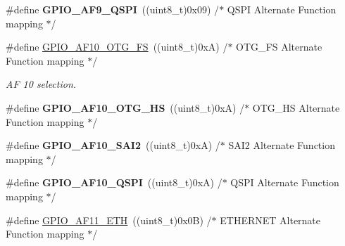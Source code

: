 \begin{DoxyCompactItemize}
\item 
\#define {\bfseries G\+P\+I\+O\+\_\+\+A\+F9\+\_\+\+Q\+S\+PI}~((uint8\+\_\+t)0x09)  /$\ast$ Q\+S\+P\+I Alternate Function mapping  $\ast$/\hypertarget{group___g_p_i_o___alternate__function__selection_gac60ecf3fb6f0a482d69e008436855bcf}{}\label{group___g_p_i_o___alternate__function__selection_gac60ecf3fb6f0a482d69e008436855bcf}

\item 
\#define \hyperlink{group___g_p_i_o___alternate__function__selection_ga0c727c03ab97a835f283684de45fbcdb}{G\+P\+I\+O\+\_\+\+A\+F10\+\_\+\+O\+T\+G\+\_\+\+FS}~((uint8\+\_\+t)0x\+A)  /$\ast$ O\+T\+G\+\_\+\+F\+S Alternate Function mapping $\ast$/\hypertarget{group___g_p_i_o___alternate__function__selection_ga0c727c03ab97a835f283684de45fbcdb}{}\label{group___g_p_i_o___alternate__function__selection_ga0c727c03ab97a835f283684de45fbcdb}

\begin{DoxyCompactList}\small\item\em AF 10 selection. \end{DoxyCompactList}\item 
\#define {\bfseries G\+P\+I\+O\+\_\+\+A\+F10\+\_\+\+O\+T\+G\+\_\+\+HS}~((uint8\+\_\+t)0x\+A)  /$\ast$ O\+T\+G\+\_\+\+H\+S Alternate Function mapping $\ast$/\hypertarget{group___g_p_i_o___alternate__function__selection_ga5a7b9743db8540e808b244eb0311052c}{}\label{group___g_p_i_o___alternate__function__selection_ga5a7b9743db8540e808b244eb0311052c}

\item 
\#define {\bfseries G\+P\+I\+O\+\_\+\+A\+F10\+\_\+\+S\+A\+I2}~((uint8\+\_\+t)0x\+A)  /$\ast$ S\+A\+I2 Alternate Function mapping   $\ast$/\hypertarget{group___g_p_i_o___alternate__function__selection_ga69f58a8552e74b7e28a48a19bd6d54fa}{}\label{group___g_p_i_o___alternate__function__selection_ga69f58a8552e74b7e28a48a19bd6d54fa}

\item 
\#define {\bfseries G\+P\+I\+O\+\_\+\+A\+F10\+\_\+\+Q\+S\+PI}~((uint8\+\_\+t)0x\+A)  /$\ast$ Q\+S\+P\+I Alternate Function mapping  $\ast$/\hypertarget{group___g_p_i_o___alternate__function__selection_ga78946ac763b506d2f35663582c4b19f3}{}\label{group___g_p_i_o___alternate__function__selection_ga78946ac763b506d2f35663582c4b19f3}

\item 
\#define \hyperlink{group___g_p_i_o___alternate__function__selection_gab9bfa13073fb15e839b71653b51c864a}{G\+P\+I\+O\+\_\+\+A\+F11\+\_\+\+E\+TH}~((uint8\+\_\+t)0x0\+B)  /$\ast$ E\+T\+H\+E\+R\+N\+E\+T Alternate Function mapping $\ast$/\hypertarget{group___g_p_i_o___alternate__function__selection_gab9bfa13073fb15e839b71653b51c864a}{}\label{group___g_p_i_o___alternate__function__selection_gab9bfa13073fb15e839b71653b51c864a}


\end{DoxyCompactItemize}
